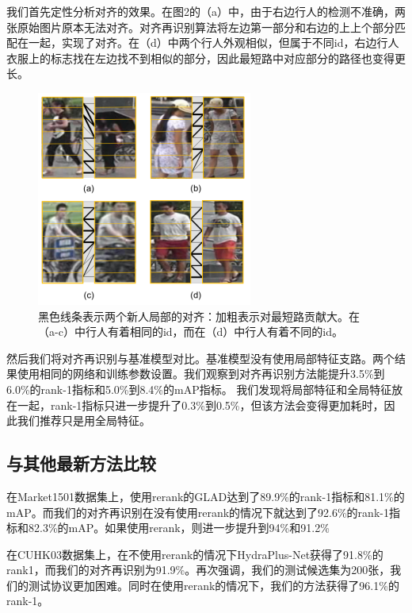 我们首先定性分析对齐的效果。在图2的（a）中，由于右边行人的检测不准确，两张原始图片原本无法对齐。对齐再识别算法将左边第一部分和右边的上上个部分匹配在一起，实现了对齐。在（d）中两个行人外观相似，但属于不同id，右边行人衣服上的标志找在左边找不到相似的部分，因此最短路中对应部分的路径也变得更长。

\begin{figure}
	\centering
	\captionsetup{width=.88\linewidth}
	\includegraphics[width=.45\linewidth,keepaspectratio]{data/waiwenfanyi/fig2.png}
	\caption{\kaiti 黑色线条表示两个新人局部的对齐：加粗表示对最短路贡献大。在（a-c）中行人有着相同的id，而在（d）中行人有着不同的id。}
	\label{figure:fig2}
\end{figure}

然后我们将对齐再识别与基准模型对比。基准模型没有使用局部特征支路。两个结果使用相同的网络和训练参数设置。我们观察到对齐再识别方法能提升3.5\%到6.0\%的rank-1指标和5.0\%到8.4\%的mAP指标。
我们发现将局部特征和全局特征放在一起，rank-1指标只进一步提升了0.3\%到0.5\%，但该方法会变得更加耗时，因此我们推荐只是用全局特征。

\subsection{与其他最新方法比较}

在Market1501数据集上，使用rerank的GLAD达到了89.9\%的rank-1指标和81.1\%的mAP。而我们的对齐再识别在没有使用rerank的情况下就达到了92.6\%的rank-1指标和82.3\%的mAP。如果使用rerank，则进一步提升到94\%和91.2\%

在CUHK03数据集上，在不使用rerank的情况下HydraPlus-Net获得了91.8\%的rank1，而我们的对齐再识别为91.9\%。再次强调，我们的测试候选集为200张，我们的测试协议更加困难。同时在使用rerank的情况下，我们的方法获得了96.1\%的rank-1。

